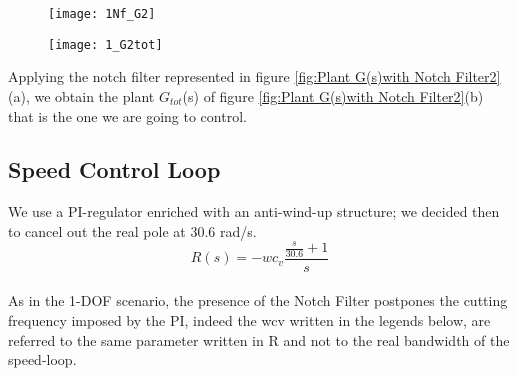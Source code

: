 \begin{figure*}[h]
	\centering
	\begin{subfigure}{0.35\columnwidth}
		\texttt{[image: 1Nf\_G2]}
	\end{subfigure}
	\begin{subfigure}{0.35\columnwidth}
		\texttt{[image: 1\_G2tot]}
	\end{subfigure}
	\caption{Plant G(s) with Notch Filter Nf(s): $G_{tot}$(s)}
	\label{fig:Plant G(s)with Notch Filter2}
\end{figure*}


Applying the notch filter represented in figure \ref{fig:Plant G(s)with Notch Filter2}(a), we obtain the plant $G_{tot}$(s) of figure \ref{fig:Plant G(s)with Notch Filter2}(b) that is the one we are going to control.

\newpage 
\subsection{Speed Control Loop}
We use a PI-regulator enriched with an anti-wind-up structure; we decided then to cancel out the real pole at 30.6 rad/s.
\\
\[
R(s)=-wc_v
\frac{\frac{s}{30.6}+1}{s}
\]
\\
As in the 1-DOF scenario, the presence of the Notch Filter postpones the cutting frequency imposed by the PI, indeed the wcv written in the legends below, are referred to the same parameter written in R and not to the real bandwidth of the speed-loop.







